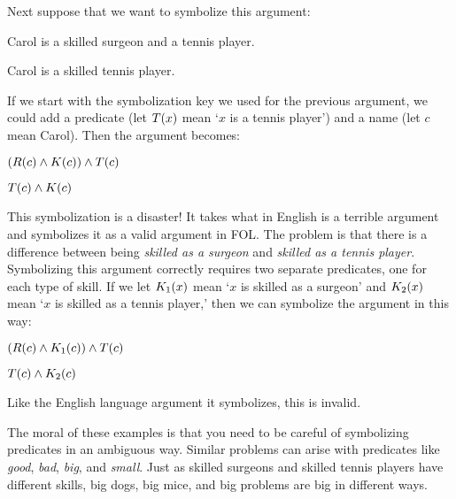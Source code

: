 Next suppose that we want to symbolize this argument:
\begin{earg}
\label{surgeon3}
\item Carol is a skilled surgeon and a tennis player. 
\item[\texttherefore] Carol is a skilled tennis player.
\end{earg}
If we start with the symbolization key we used for the previous argument, we could add a predicate (let $T(x)$ mean `$x$ is a tennis player') and a name (let $c$ mean Carol). Then the argument becomes:
\begin{earg}
\item[] $(R(c) \wedge K(c)) \wedge T(c)$
\item[\texttherefore] $T(c) \wedge K(c)$
\end{earg}
This symbolization is a disaster! It takes what in English is a terrible argument and symbolizes it as a valid argument in FOL. The problem is that there is a difference between being \emph{skilled as a surgeon} and \emph{skilled as a tennis player}. Symbolizing this argument correctly requires two separate predicates, one for each type of skill. If we let $K_1(x)$ mean `$x$ is skilled as a surgeon' and $K_2(x)$ mean `$x$ is skilled as a tennis player,' then we can symbolize the argument in this way:
\begin{earg}
\label{surgeon3correct}
\item[] $(R(c) \wedge K_1(c)) \wedge T(c)$
\item[\texttherefore] $T(c) \wedge K_2(c)$
\end{earg}
Like the English language argument it symbolizes, this is invalid. %

The moral of these examples is that you need to be careful of symbolizing predicates in an ambiguous way. Similar problems can arise with predicates like \emph{good}, \emph{bad}, \emph{big}, and \emph{small}. Just as skilled surgeons and skilled tennis players have different skills, big dogs, big mice, and big problems are big in different ways.

